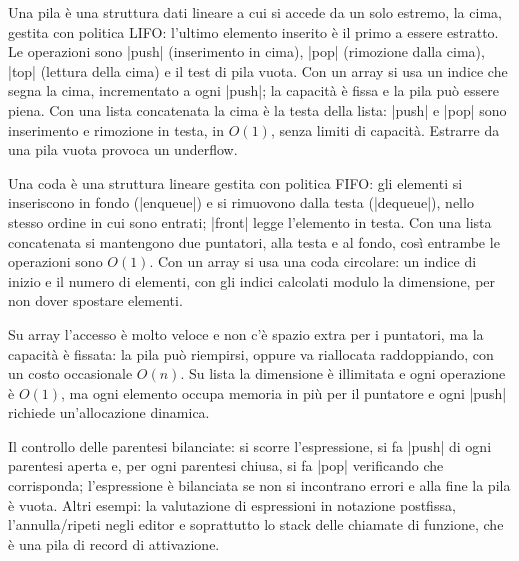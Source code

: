 \begin{orale}
Una pila è una struttura dati lineare a cui si accede da un solo estremo, la cima,
gestita con politica LIFO: l'ultimo elemento inserito è il primo a essere estratto. Le
operazioni sono \cc|push| (inserimento in cima), \cc|pop| (rimozione dalla cima), \cc|top|
(lettura della cima) e il test di pila vuota. Con un array si usa un indice che segna la
cima, incrementato a ogni \cc|push|; la capacità è fissa e la pila può essere piena. Con
una lista concatenata la cima è la testa della lista: \cc|push| e \cc|pop| sono
inserimento e rimozione in testa, in $O(1)$, senza limiti di capacità. Estrarre da una
pila vuota provoca un underflow.
\end{orale}

\begin{orale}
Una coda è una struttura lineare gestita con politica FIFO: gli elementi si inseriscono
in fondo (\cc|enqueue|) e si rimuovono dalla testa (\cc|dequeue|), nello stesso ordine in
cui sono entrati; \cc|front| legge l'elemento in testa. Con una lista concatenata si
mantengono due puntatori, alla testa e al fondo, così entrambe le operazioni sono
$O(1)$. Con un array si usa una coda circolare: un indice di inizio e il numero di
elementi, con gli indici calcolati modulo la dimensione, per non dover spostare elementi.
\end{orale}

\begin{orale}
Su array l'accesso è molto veloce e non c'è spazio extra per i puntatori, ma la
capacità è fissata: la pila può riempirsi, oppure va riallocata raddoppiando, con un costo
occasionale $O(n)$. Su lista la dimensione è illimitata e ogni operazione è $O(1)$, ma
ogni elemento occupa memoria in più per il puntatore e ogni \cc|push| richiede
un'allocazione dinamica.
\end{orale}

\begin{orale}
Il controllo delle parentesi bilanciate: si scorre l'espressione, si fa \cc|push| di ogni
parentesi aperta e, per ogni parentesi chiusa, si fa \cc|pop| verificando che corrisponda;
l'espressione è bilanciata se non si incontrano errori e alla fine la pila è vuota. Altri
esempi: la valutazione di espressioni in notazione postfissa, l'annulla/ripeti negli
editor e soprattutto lo stack delle chiamate di funzione, che è una pila di record di
attivazione.
\end{orale}

